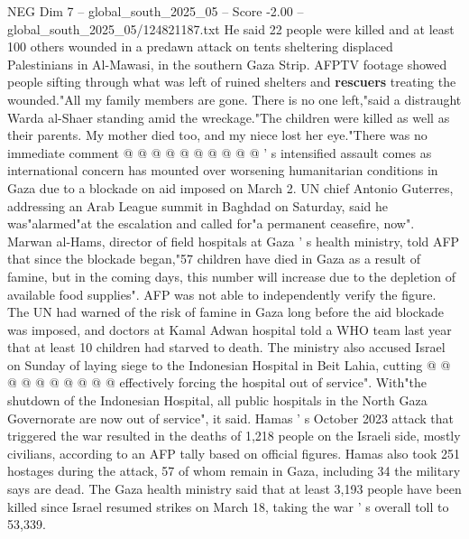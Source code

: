\begin{textsample}{NEG Dim 7 – global\_south\_2025\_05 – Score -2.00 – global\_south\_2025\_05/124821187.txt}
He said 22 people were killed and at least 100 others wounded in a predawn attack on tents sheltering displaced Palestinians in Al-Mawasi, in the southern Gaza Strip.
AFPTV footage showed people sifting through what was left of ruined shelters and \textbf{rescuers} treating the wounded."All my family members are gone.
There is no one left,"said a distraught Warda al-Shaer standing amid the wreckage."The children were killed as well as their parents.
My mother died too, and my niece lost her eye."There was no immediate comment @ @ @ @ @ @ @ @ @ @ ' s intensified assault comes as international concern has mounted over worsening humanitarian conditions in Gaza due to a blockade on aid imposed on March 2.
UN chief Antonio Guterres, addressing an Arab League summit in Baghdad on Saturday, said he was"alarmed"at the escalation and called for"a permanent ceasefire, now".
Marwan al-Hams, director of field hospitals at Gaza ' s health ministry, told AFP that since the blockade began,"57 children have died in Gaza as a result of famine, but in the coming days, this number will increase due to the depletion of available food supplies".
AFP was not able to independently verify the figure.
The UN had warned of the risk of famine in Gaza long before the aid blockade was imposed, and doctors at Kamal Adwan hospital told a WHO team last year that at least 10 children had starved to death.
The ministry also accused Israel on Sunday of laying siege to the Indonesian Hospital in Beit Lahia, cutting @ @ @ @ @ @ @ @ @ @ effectively forcing the hospital out of service".
With"the shutdown of the Indonesian Hospital, all public hospitals in the North Gaza Governorate are now out of service", it said.
Hamas ' s October 2023 attack that triggered the war resulted in the deaths of 1,218 people on the Israeli side, mostly civilians, according to an AFP tally based on official figures.
Hamas also took 251 hostages during the attack, 57 of whom remain in Gaza, including 34 the military says are dead.
The Gaza health ministry said that at least 3,193 people have been killed since Israel resumed strikes on March 18, taking the war ' s overall toll to 53,339.

\end{textsample}
